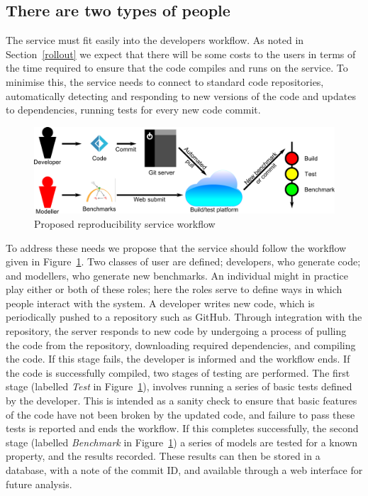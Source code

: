\documentclass[conference]{IEEEtran}
\begin{document}
\subsection{There are two types of people}

The service must fit easily into the developers workflow. As
noted in Section~\ref{rollout} we expect that there will be some costs
to the users in terms of the time required to ensure that the code
compiles and runs on the service. To minimise this, the service needs
to connect to standard code repositories, automatically detecting and
responding to new versions of the code and updates to dependencies,
running tests for every new code commit.

\begin{figure}[!htp]
	\centering
	\includegraphics[width=\textwidth]{workflow}
	\caption{Proposed reproducibility service workflow}
	\label{schematic}
\end{figure}

To address these needs we propose that the service should follow the
workflow given in Figure~\ref{schematic}. Two classes of user are
defined; developers, who generate code; and modellers, who generate
new benchmarks. An individual might in practice play either or both of
these roles; here the roles serve to define ways in which people
interact with the system. A developer writes new code, which is
periodically pushed to a repository such as GitHub. Through
integration with the repository, the server responds to new code by
undergoing a process of pulling the code from the repository,
downloading required dependencies, and compiling the code. If this
stage fails, the developer is informed and the workflow ends. If the
code is successfully compiled, two stages of testing are
performed. The first stage (labelled {\emph{Test}} in
Figure~\ref{schematic}), involves running a series of basic tests
defined by the developer. This is intended as a sanity check to ensure
that basic features of the code have not been broken by the updated
code, and failure to pass these tests is reported and ends the
workflow. If this completes successfully, the second stage (labelled
{\emph{Benchmark}} in Figure~\ref{schematic}) a series of models are
tested for a known property, and the results recorded. These results
can then be stored in a database, with a note of the commit ID, and
available through a web interface for future analysis.
\end{document}
